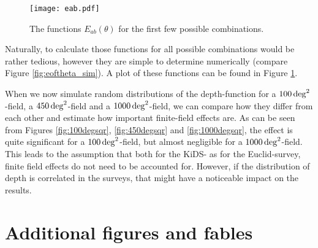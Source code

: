 \begin{figure}
\centering
\texttt{[image: eab.pdf]}
\caption{The functions $E_{ab}(\theta)$ for the first few possible combinations.}
\label{fig:eab}
\end{figure}
Naturally, to calculate those functions for all possible combinations would be rather tedious, however they are simple to determine numerically (compare Figure \ref{fig:eoftheta_sim}). A plot of these functions can be found in Figure \ref{fig:eab}.

When we now simulate random distributions of the depth-function for a $100\,\rm{deg}^2$-field, a $450\,\rm{deg}^2$-field and a $1000\,\rm{deg}^2$-field, we can compare how they differ from each other and estimate how important finite-field effects are. As can be seen from Figures \ref{fig:100degsqr}, \ref{fig:450degsqr} and \ref{fig:1000degsqr}, the effect is quite significant for a $100\,\rm{deg}^2$-field, but almost negligible for a $1000\,\rm{deg}^2$-field. This leads to the assumption that both for the KiDS- as for the Euclid-survey, finite field effects do not need to be accounted for. However, if the distribution of depth is correlated in the surveys, that might have a noticeable impact on the results.




\chapter{Additional figures and fables}
